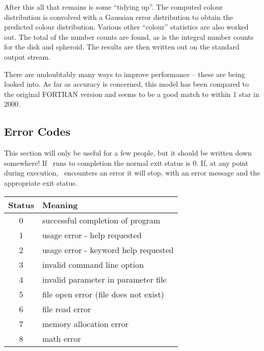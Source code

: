 \documentclass[11pt,twoside]{article}
\begin{document}
After this all that remains is some ``tidying up''. The computed colour
distribution is convolved with a Gaussian error distribution to obtain the 
predicted colour distribution. Various other ``colour'' statistics are also
worked out. The total of the number counts are found, as is the integral
number counts for the disk and spheroid.
The results are then written out on the standard output stream.

There are undoubtably many ways to improve performance -- these are being
looked into. As far as accuracy is concerned, this model has been compared 
to the original FORTRAN version and seems to be a good match to within 1 
star in 2000.

\subsection{Error Codes}

This section will only be useful for a few people, but it should be written
down somewhere! If \bsm\ runs to completion the normal exit status is 0.
If, at any point during execution, \bsm\ encounters an error it will stop,
with an error message and the appropriate exit status.

\begin{table}[h]
\centering
\begin{tabular}{|c|l|} \hline
Status & Meaning \\ \hline
 0 & successful completion of program \\
 1 & usage error - help requested \\
 2 & usage error - keyword help requested \\
 3 & invalid command line option \\
 4 & invalid parameter in parameter file \\
 5 & file open error (file does not exist) \\
 6 & file read error \\
 7 & memory allocation error \\
 8 & math error \\ \hline
\end{tabular}
\end{table}

\newpage
\end{document}
